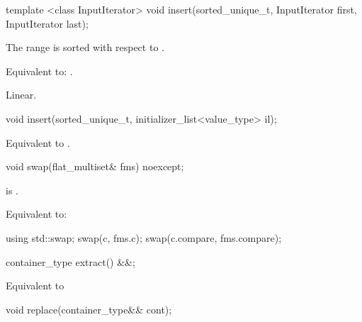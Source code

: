\begin{codeblock}
\begin{codeblock}
\begin{codeblock}
\begin{addedblock}
%
\begin{itemdecl}
template <class InputIterator>
  void insert(sorted_unique_t, InputIterator first, InputIterator last);
\end{itemdecl}

\begin{itemdescr}
\pnum \expects
The range  is sorted with respect to .

\pnum \effects Equivalent to: .

\pnum \complexity Linear.
\end{itemdescr}

%
\begin{itemdecl}
void insert(sorted_unique_t, initializer_list<value_type> il);
\end{itemdecl}

\begin{itemdescr}
\pnum \effects Equivalent to .
\end{itemdescr}

%
\begin{itemdecl}
void swap(flat_multiset& fms) noexcept;
\end{itemdecl}

\begin{itemdescr}
\pnum \constraints {} is .

\pnum \effects Equivalent to:
\begin{codeblock}
using std::swap;
swap(c, fms.c);
swap(c.compare, fms.compare);
\end{codeblock}
\end{itemdescr}

%
\begin{itemdecl}
container_type extract() &&;
\end{itemdecl}

\begin{itemdescr}
\effects Equivalent to 
\end{itemdescr}

%
\begin{itemdecl}
void replace(container_type&& cont);
\end{itemdecl}


\end{addedblock}
\end{codeblock}
\end{codeblock}
\end{codeblock}

